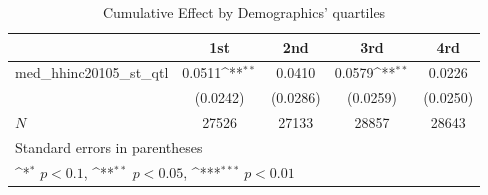 \begin{table}[htbp]\centering
\def\sym#1{\ifmmode^{#1}\else\(^{#1}\)\fi}
\caption{Cumulative Effect by Demographics' quartiles}
\begin{tabular}{l*{4}{c}}
\hline\hline
            &\multicolumn{1}{c}{1st}&\multicolumn{1}{c}{2nd}&\multicolumn{1}{c}{3rd}&\multicolumn{1}{c}{4rd}\\
\hline
med\_hhinc20105\_st\_qtl&      0.0511\sym{**} &      0.0410         &      0.0579\sym{**} &      0.0226         \\
            &    (0.0242)         &    (0.0286)         &    (0.0259)         &    (0.0250)         \\
\hline
\(N\)       &       27526         &       27133         &       28857         &       28643         \\
\hline\hline
\multicolumn{5}{l}{\footnotesize Standard errors in parentheses}\\
\multicolumn{5}{l}{\footnotesize \sym{*} \(p<0.1\), \sym{**} \(p<0.05\), \sym{***} \(p<0.01\)}\\
\end{tabular}
\end{table}
